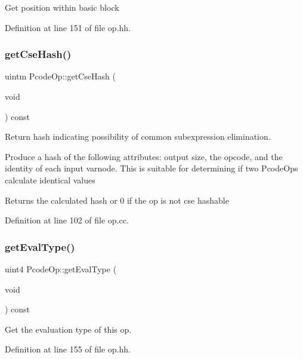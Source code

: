 Get position within basic block 

Definition at line 151 of file op.\+hh.

\mbox{\label{class_pcode_op_a9993dd93bcad16183589a46404c5961f}} 
\subsubsection{\texorpdfstring{getCseHash()}{getCseHash()}}
{\footnotesize\ttfamily uintm Pcode\+Op\+::get\+Cse\+Hash (\begin{DoxyParamCaption}\item[{void}]{ }\end{DoxyParamCaption}) const}



Return hash indicating possibility of common subexpression elimination. 

Produce a hash of the following attributes\+: output size, the opcode, and the identity of each input varnode. This is suitable for determining if two Pcode\+Ops calculate identical values \begin{DoxyReturn}{Returns}
the calculated hash or 0 if the op is not cse hashable 
\end{DoxyReturn}


Definition at line 102 of file op.\+cc.

\mbox{\label{class_pcode_op_aad460cabfdd49e554f3c28e44cbce3e1}} 
\subsubsection{\texorpdfstring{getEvalType()}{getEvalType()}}
{\footnotesize\ttfamily uint4 Pcode\+Op\+::get\+Eval\+Type (\begin{DoxyParamCaption}\item[{void}]{ }\end{DoxyParamCaption}) const\hspace{0.3cm}{\ttfamily [inline]}}



Get the evaluation type of this op. 



Definition at line 155 of file op.\+hh.

